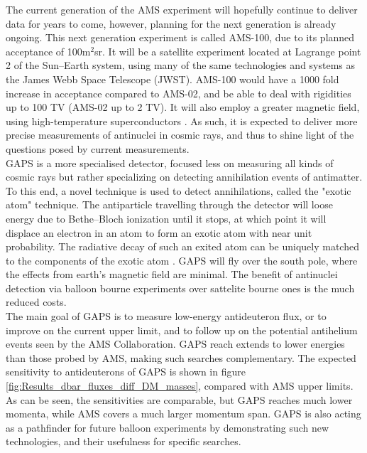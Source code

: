 The current generation of the AMS experiment will hopefully continue to deliver data for years to come, however, planning for the next generation is already ongoing. This next generation experiment is called AMS-100, due to its planned acceptance of 100m$^2$sr. It will be a satellite experiment located at Lagrange point 2 of the Sun--Earth system, using many of the same technologies and systems as the James Webb Space Telescope (JWST). AMS-100 would have a 1000 fold increase in acceptance compared to AMS-02, and be able to deal with rigidities up to 100 TV (AMS-02 up to 2 TV). It will also employ a greater magnetic field, using high-temperature superconductors \cite{}. As such, it is expected to deliver more precise measurements of antinuclei in cosmic rays, and thus to shine light of the questions posed by current measurements.\\

GAPS is a more specialised detector, focused less on measuring all kinds of cosmic rays but rather specializing on detecting annihilation events of antimatter. To this end, a novel technique is used to detect annihilations, called the "exotic atom" technique. The antiparticle travelling through the detector will loose energy due to Bethe--Bloch ionization until it stops, at which point it will displace an electron in an atom to form an exotic atom with near unit probability. The radiative decay of such an exited atom can be uniquely matched to the components of the exotic atom \cite{}. GAPS will fly over the south pole, where the effects from earth's magnetic field are minimal. The benefit of antinuclei detection via balloon bourne experiments over sattelite bourne ones is the much reduced costs.\\

The main goal of GAPS is to measure low-energy antideuteron flux, or to improve on the current upper limit, and to follow up on the potential antihelium events seen by the AMS Collaboration. GAPS reach extends to lower energies than those probed by AMS, making such searches complementary. The expected sensitivity to antideuterons of GAPS is shown in figure \ref{fig:Results_dbar_fluxes_diff_DM_masses}, compared with AMS upper limits. As can be seen, the sensitivities are comparable, but GAPS reaches much lower momenta, while AMS covers a much larger momentum span. GAPS is also acting as a pathfinder for future balloon experiments by demonstrating such new technologies, and their usefulness for specific searches. 



